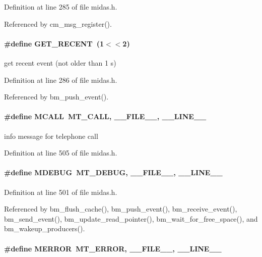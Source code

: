 Definition at line 285 of file midas.h.

Referenced by cm\_\-msg\_\-register().
\paragraph[{GET\_\-RECENT}]{\setlength{\rightskip}{0pt plus 5cm}\#define GET\_\-RECENT~(1$<$$<$2)}\hfill\label{group__mdefineh_ga3275482a8a2223e4d57ac51d967979f8}
get recent event (not older than 1 s) 

Definition at line 286 of file midas.h.

Referenced by bm\_\-push\_\-event().
\paragraph[{MCALL}]{\setlength{\rightskip}{0pt plus 5cm}\#define MCALL~MT\_\-CALL,  \_\-\_\-FILE\_\-\_\-, \_\-\_\-LINE\_\-\_\-}\hfill\label{group__mdefineh_ga9f2fa3417c41f059c815b9c0eba73db2}
info message for telephone call 

Definition at line 505 of file midas.h.
\paragraph[{MDEBUG}]{\setlength{\rightskip}{0pt plus 5cm}\#define MDEBUG~MT\_\-DEBUG, \_\-\_\-FILE\_\-\_\-, \_\-\_\-LINE\_\-\_\-}\hfill\label{group__mdefineh_gad769dc7be0dc5189e019d56664a18655}

\begin{DoxyItemize}
\item 
\end{DoxyItemize}

Definition at line 501 of file midas.h.

Referenced by bm\_\-flush\_\-cache(), bm\_\-push\_\-event(), bm\_\-receive\_\-event(), bm\_\-send\_\-event(), bm\_\-update\_\-read\_\-pointer(), bm\_\-wait\_\-for\_\-free\_\-space(), and bm\_\-wakeup\_\-producers().
\paragraph[{MERROR}]{\setlength{\rightskip}{0pt plus 5cm}\#define MERROR~MT\_\-ERROR, \_\-\_\-FILE\_\-\_\-, \_\-\_\-LINE\_\-\_\-}\hfill\label{group__mdefineh_gac2d967025ca0f84f611d568f4ede934a}

